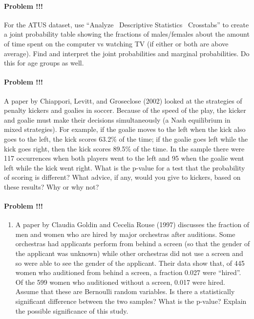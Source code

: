\documentclass[]{article}
\providecommand{\tightlist}{%
  \setlength{\itemsep}{0pt}\setlength{\parskip}{0pt}}
\let\oldparagraph\paragraph
\renewcommand{\paragraph}[1]{\oldparagraph{#1}\mbox{}}
\begin{document}
\paragraph{Problem !!!}\label{problem-1}

For the ATUS dataset, use ``Analyze ~Descriptive Statistics ~Crosstabs''
to create a joint probability table showing the fractions of
males/females about the amount of time spent on the computer vs watching
TV (if either or both are above average). Find and interpret the joint
probabilities and marginal probabilities. Do this for age groups as
well.

\paragraph{Problem !!!}\label{problem-2}

A paper by Chiappori, Levitt, and Groseclose (2002) looked at the
strategies of penalty kickers and goalies in soccer. Because of the
speed of the play, the kicker and goalie must make their decisions
simultaneously (a Nash equilibrium in mixed strategies). For example, if
the goalie moves to the left when the kick also goes to the left, the
kick scores 63.2\% of the time; if the goalie goes left while the kick
goes right, then the kick scores 89.5\% of the time. In the sample there
were 117 occurrences when both players went to the left and 95 when the
goalie went left while the kick went right. What is the p-value for a
test that the probability of scoring is different? What advice, if any,
would you give to kickers, based on these results? Why or why not?

\paragraph{Problem !!!}\label{problem-3}

\begin{enumerate}
\def\labelenumi{\arabic{enumi}.}
\setcounter{enumi}{49}
\tightlist
\item
  A paper by Claudia Goldin and Cecelia Rouse (1997) discusses the
  fraction of men and women who are hired by major orchestras after
  auditions. Some orchestras had applicants perform from behind a screen
  (so that the gender of the applicant was unknown) while other
  orchestras did not use a screen and so were able to see the gender of
  the applicant. Their data show that, of 445 women who auditioned from
  behind a screen, a fraction 0.027 were ``hired''. Of the 599 women who
  auditioned without a screen, 0.017 were hired. Assume that these are
  Bernoulli random variables. Is there a statistically significant
  difference between the two samples? What is the p-value? Explain the
  possible significance of this study.
\end{enumerate}
\end{document}
